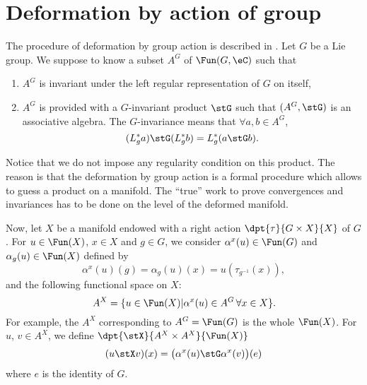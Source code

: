 
\section{Deformation by action of group}    \label{SecDefAction}        %

The procedure of deformation by group action is described in \cite{TrsStProd}. Let $G$ be a Lie group. We suppose to know a subset $A^G$ of $\Fun(G,\eC)$  such that
\begin{enumerate}
\item $A^G$ is invariant under the left regular representation of $G$ on itself,
\item $A^G$ is provided with a $G$-invariant product $\stG$ such that $(A^G,\stG)$ is an associative algebra. The $G$-invariance means that $\forall a,b\in A^G$,
\[
    (L^*_ga)\stG(L^*_gb)=L^*_g(a\stG b).
\]
\end{enumerate}

Notice that we do not impose any regularity condition on this product. The reason is that the deformation by group action is a formal procedure which allows to guess a product on a manifold. The ``true'' work to prove convergences and invariances has to be done on the level of the deformed manifold.

Now, let $X$ be a manifold endowed with a right action  $\dpt{\tau}{G\times X}{X}$ of $G$.  For $u\in\Fun(X)$, $x\in X$ and $g\in G$, we consider $\alpha^x(u)\in\Fun(G)$ and $\alpha_g(u)\in\Fun(X)$ defined by
\begin{equation}        \label{EqDefalphaxu}
   \alpha^x(u)(g)=\alpha_g(u)(x)=u(\tau_{g^{-1}}(x)),
\end{equation}
and the following functional space on $X$:
\[
   A^X=\{u\in\Fun(X)|\alpha^x(u)\in A^G\,\forall x\in X\}.
\]
For example, the $A^X$ corresponding to $A^G=\Fun(G)$ is the whole $\Fun(X)$.  For $u$, $v\in A^X$, we define $\dpt{\stX}{A^X\times A^X}{\Fun(X)}$
\begin{equation}\label{eq:def_stG}
   (u\stX v)(x)=\big(\alpha^x(u)\stG \alpha^x(v)\big)(e)
\end{equation}
where $e$ is the identity of $G$.


